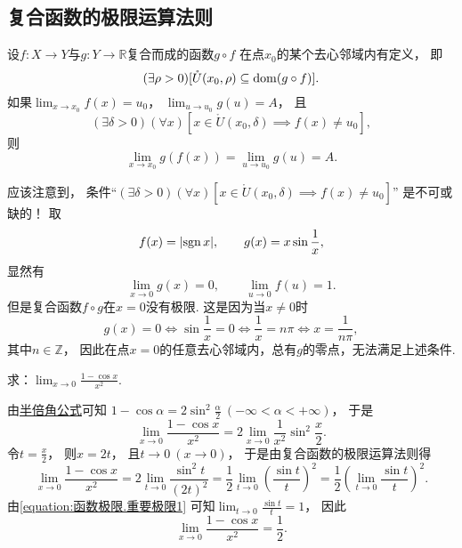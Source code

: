 \subsection{复合函数的极限运算法则}
\begin{theorem}\label{theorem:极限.复合函数的极限运算法则1}
设\(f\colon X\to Y\)与\(g\colon Y\to\mathbb{R}\)复合而成的函数\(g \circ f\)
在点\(x_0\)的某个去心邻域内有定义，
即\[
	(\exists\rho>0)[\mathring{U}(x_0,\rho) \subseteq \operatorname{dom}(g \circ f)].
\]
如果\(\lim_{x \to x_0} f(x) = u_0\)，
\(\lim_{u \to u_0} g(u) = A\)，
且\[
	(\exists\delta>0)(\forall x)[x\in\mathring{U}(x_0,\delta) \implies f(x)\neq u_0],
\]
则\[
	\lim_{x \to x_0} g(f(x))
	= \lim_{u \to u_0} g(u)
	= A.
\]
\end{theorem}

\begin{remark}
应该注意到，
条件“\((\exists\delta>0)(\forall x)[x\in\mathring{U}(x_0,\delta) \implies f(x)\neq u_0]\)”
是不可或缺的！
取\[
	f(x) = \abs{\operatorname{sgn} x}, \qquad
	g(x) = x \sin\frac1x,
\]
显然有\[
	\lim_{x\to0} g(x) = 0, \qquad
	\lim_{u\to0} f(u) = 1.
\]
但是复合函数\(f \circ g\)在\(x=0\)没有极限.
这是因为当\(x\neq0\)时\[
	g(x) = 0
	\iff
	\sin\frac1x = 0
	\iff
	\frac1x = n\pi
	\iff
	x = \frac1{n\pi},
\]
其中\(n\in\mathbb{Z}\)，
因此在点\(x=0\)的任意去心邻域内，总有\(g\)的零点，无法满足上述条件.
\end{remark}

\begin{example}
求：\(\lim_{x\to0} \frac{1-\cos x}{x^2}\).
\begin{solution}
由\hyperref[equation:三角函数.正弦的半倍角公式]{半倍角公式}可知
\(1 - \cos\alpha = 2\sin^2\frac\alpha2\ (-\infty<\alpha<+\infty)\)，
于是\[
	\lim_{x\to0} \frac{1-\cos x}{x^2}
	= 2 \lim_{x\to0} \frac1{x^2} \sin^2\frac{x}2.
\]
令\(t=\frac{x}2\)，
则\(x=2t\)，
且\(t\to0\ (x\to0)\)，
于是由复合函数的极限运算法则得\[
	\lim_{x\to0} \frac{1-\cos x}{x^2}
	= 2 \lim_{t\to0} \frac{\sin^2 t}{(2t)^2}
	= \frac12 \lim_{t\to0} \left(\frac{\sin t}{t}\right)^2
	= \frac12 \left(\lim_{t\to0} \frac{\sin t}{t}\right)^2.
\]
由\cref{equation:函数极限.重要极限1} 可知\(\lim_{t\to0} \frac{\sin t}{t} = 1\)，
因此\begin{equation}\label{equation:函数极限.重要极限8}
	\lim_{x\to0} \frac{1-\cos x}{x^2} = \frac12.
\end{equation}
\end{solution}
\end{example}

